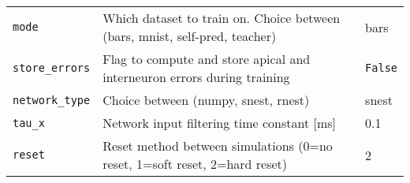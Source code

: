 \begin{table}
\begin{center}
\begin{tabular}{p{}p{}p{}}
      \\
      \texttt{mode}                & Which dataset to train on. Choice between (bars, mnist, self-pred, teacher) & bars
      \\
      \texttt{store\_errors}       & Flag to compute and store apical and interneuron errors during training     &
      \texttt{False}
      \\
      \texttt{network\_type}       & Choice between (numpy, snest, rnest)                                        & snest
      \\
      \texttt{tau\_x}              & Network input filtering time constant [ms]                                  & 0.1
      \\
      \texttt{reset}               & Reset method between simulations (0=no reset, 1=soft reset, 2=hard reset)   & 2     \\


\end{tabular}
\end{center}
\end{table}

